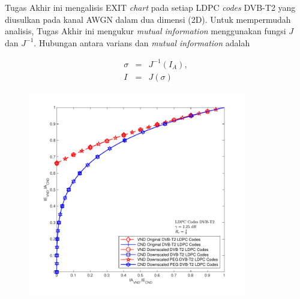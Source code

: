 Tugas Akhir ini mengalisis EXIT \textit{chart} pada setiap LDPC \textit{codes} DVB-T2 yang diusulkan pada kanal AWGN dalam dua dimensi (2D). Untuk mempermudah analisis, Tugas Akhir ini mengukur \textit{mutual information} menggunakan fungsi $J$ dan $J^{-1}$. Hubungan antara varians dan \textit{mutual information} adalah \cite{exit1}

\begin{eqnarray}
\sigma &=& J^{-1}({I_{A}}),\\
I&=&J(\sigma)
\end{eqnarray}
\begin{figure}
	\centering
	\begin{minipage}{1\linewidth}
		\hspace{0.75 cm}
		\includegraphics[width=0.85\textwidth]{pics/exit/12/12semua=snr2,25Ich=0,6613.pdf}
		\vspace{-1cm}
		

\end{minipage}
\end{figure}
